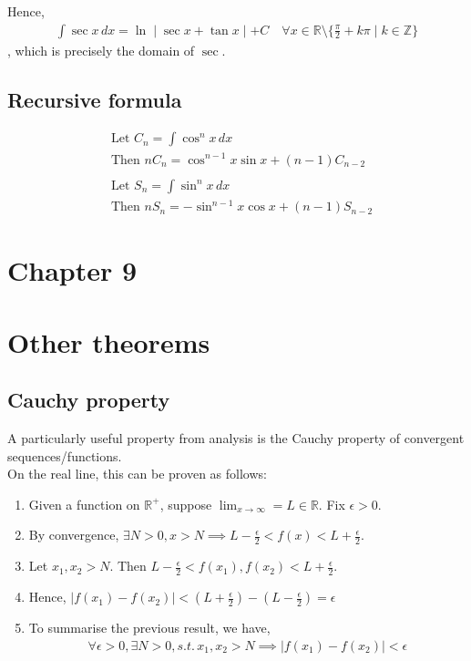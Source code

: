 \documentclass{article}
\begin{document}
Hence, 
\begin{align*}
    \int \sec x\, dx=\ln \mid \sec x+\tan x \mid + C \quad \forall x\in \mathbb{R}\setminus \{\frac{\pi}{2} +k\pi \mid k\in \mathbb{Z}\}
\end{align*}
, which is precisely the domain of $\sec$.

\subsection{Recursive formula}
\begin{align*}
    &\text{Let } C_n=\int \cos^nx\, dx\\
    &\text{Then } nC_n=\cos^{n-1}x\sin x+(n-1)C_{n-2}\\
    \\
    &\text{Let } S_n=\int \sin^nx\, dx\\
    &\text{Then } nS_n=-\sin^{n-1}x\cos x+(n-1)S_{n-2}
\end{align*}


\section{Chapter 9}


\section{Other theorems}
\subsection{Cauchy property}
A particularly useful property from analysis is the Cauchy property of convergent sequences/functions.\\
On the real line, this can be proven as follows:

\begin{enumerate}
	\item Given a function on $\mathbb{R}^+$, suppose $\lim_{x\rightarrow \infty}=L\in \mathbb{R}$. Fix $\epsilon > 0$.
	\item By convergence, $\exists N>0, x>N \implies L-\frac{\epsilon}{2} < f(x) < L+\frac{\epsilon}{2}$.
	\item Let $x_1,x_2>N$. Then $L-\frac{\epsilon}{2} < f(x_1), f(x_2) < L+\frac{\epsilon}{2}$.
	\item Hence, $|f(x_1)-f(x_2)|<(L+\frac{\epsilon}{2})-(L-\frac{\epsilon}{2})=\epsilon$
	\item To summarise the previous result, we have,
	\begin{align*}
		\forall \epsilon>0, \exists N>0, s.t.\, x_1,x_2>N \implies |f(x_1)-f(x_2)|<\epsilon
	\end{align*}
\end{enumerate}
\end{document}
